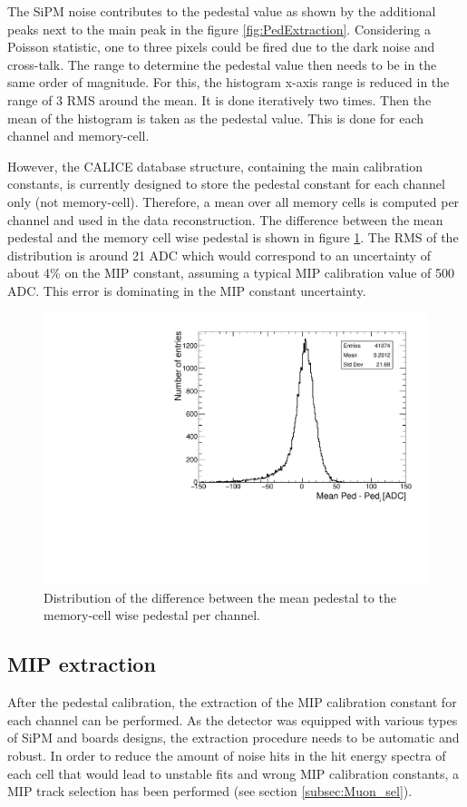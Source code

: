 The SiPM noise contributes to the pedestal value as shown by the additional peaks next to the main peak in the figure \ref{fig:PedExtraction}. Considering a Poisson statistic, one to three pixels could be fired due to the dark noise and cross-talk. The range to determine the pedestal value then needs to be in the same order of magnitude. For this, the histogram x-axis range is reduced in the range of 3 RMS around the mean. It is done iteratively two times. Then the mean of the histogram is taken as the pedestal value. This is done for each channel and memory-cell.

However, the CALICE database structure, containing the main calibration constants, is currently designed to store the pedestal constant for each channel only (not memory-cell). Therefore, a mean over all memory cells is computed per channel and used in the data reconstruction. The difference between the mean pedestal and the memory cell wise pedestal is shown in figure \ref{fig:CompMeanMem}. The RMS of the distribution is around 21 ADC which would correspond to an uncertainty of about 4\% on the MIP constant, assuming a typical MIP calibration value of 500 ADC. This error is dominating in the MIP constant uncertainty.

\begin{figure}[htbp!]
	\centering
	\includegraphics[width=0.6\linewidth]{../Thesis_Plots/EnergyCalib/Plots/ComparisonMeanPedtoMemorycell.pdf}
	\caption{Distribution of the difference between the mean pedestal to the memory-cell wise pedestal per channel.} \label{fig:CompMeanMem}
\end{figure}

\subsection{MIP extraction}
\label{sec:MIPExtraction}

After the pedestal calibration, the extraction of the MIP calibration constant for each channel can be performed. As the detector was equipped with various types of SiPM and boards designs, the extraction procedure needs to be automatic and robust. In order to reduce the amount of noise hits in the hit energy spectra of each cell that would lead to unstable fits and wrong MIP calibration constants, a MIP track selection has been performed (see section \ref{subsec:Muon_sel}).

